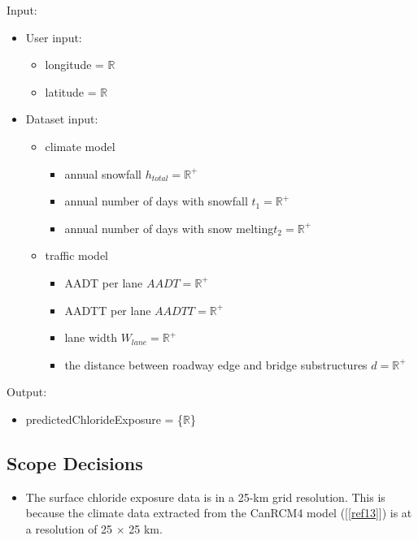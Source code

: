 \documentclass[12pt]{article}
\newcommand{\reref}[1]{\ref{#1}}
\begin{document}
Input:
\begin{itemize}
\item User input: 

\begin{itemize}
\item longitude = $\mathbb{R}$
\item latitude = $\mathbb{R}$
\end{itemize}

\item Dataset input: 
\begin{itemize}
\item climate model

\begin{itemize}
\item annual snowfall $h_{total} = \mathbb R^{+}$ 
\item annual number of days with snowfall $t_1 = \mathbb R^{+}$
\item annual number of days with snow melting$t_2 = \mathbb R^{+}$
\end{itemize}

\item traffic model 
\begin{itemize}
\item AADT per lane $AADT = \mathbb R^{+}$
\item AADTT per lane $AADTT = \mathbb R^{+}$ 
\item lane width $W_{lane} = \mathbb R^{+}$
\item the distance between roadway edge and bridge substructures $d = \mathbb R^{+}$
\end{itemize}
\end{itemize}

\end{itemize}
Output:
\begin{itemize}
\item predictedChlorideExposure = \{$\mathbb{R}$\}
\end{itemize}


\subsection{Scope Decisions}
\begin{itemize}
\item The surface chloride exposure data is in a 25-km grid resolution. This is because the climate data extracted from the CanRCM4 model ([\reref{ref13}]) is at a resolution of 25 $\times$ 25 km.
\end{itemize}
\end{document}
